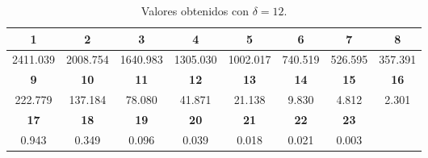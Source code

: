 \documentclass[letterpaper, titlepage,openright, twoside,11pt]{book}
\begin{document}
\begin{itemize}
\begin{table}[h!]
\centering
\begin{tabular}{|c|c|c|c|c|c|c|c|}
\hline
\bf{1} &                   \bf{2} &                   \bf{3} &                   \bf{ 4 }&                    \bf{ 5}&              \bf{ 6} &               \bf{ 7} & \bf{8} \\
\hline
2411.039  & 2008.754 &1640.983 &1305.030 &1002.017 & 740.519 & 526.595 & 357.391    \\
\hline
\bf{9} &                \bf{ 10}&              \bf{      11} &                   \bf{ 12} &               \bf{      13}&              \bf{14} &  \bf{ 15} & \bf{16 }   \\
\hline
	 222.779 & 137.184 &  78.080 &   41.871 &  21.138  &   9.830  &    4.812  &  2.301    \\
	 \hline
	
\bf{17} &     \bf{ 18}&   \bf{19}&   \bf{ 20} &           \bf{   21}&                \bf{  22}  & \bf{23} &  \\
\hline
      0.943    &  0.349 &   0.096 &   0.039 &   0.018 &   0.021 &   0.003  & \\
   \hline
\end{tabular}
\caption{Valores obtenidos con $\delta=12$.}\label{3}
\end{table}



\end{itemize}
\end{document}
